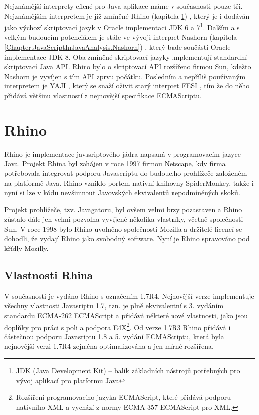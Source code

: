 Nejznámější interprety cílené pro Java aplikace máme v současnosti pouze tři. Nejznámějším interpretem je již zmíněné Rhino (kapitola \ref{Chapter.JavaScriptInJavaAnalysis.Rhino}) \cite{Bibliography.Rhino.Docs}, který je i dodáván jako výchozí skriptovací jazyk v Oracle implementaci JDK 6 a 7\footnote{JDK (Java Development Kit) -- balík základních nástrojů potřebných pro vývoj aplikací pro platformu Java}. Dalším a s velkým budoucím potenciálem je stále ve vývoji interpret Nashorn (kapitola \ref{Chapter.JavaScriptInJavaAnalysis.Nashorn}) \cite{Bibliography.Nashorn.Project}, který bude součásti Oracle implementace JDK 8. Oba zmíněné skriptovací jazyky implementují standardní skriptovací Java API. Rhino bylo o skriptovací API rozšířeno firmou Sun, kdežto Nashorn je vyvíjen s tím API zprvu počátku. Posledním a nepříliš používaným interpretem je YAJI \cite{Bibliography.YAJI.Project}, který se snaží oživit starý interpret FESI \cite{Bibliography.FESI.Project}, tím že do něho přidává většinu vlastností z nejnovější specifikace ECMAScriptu.

\section{Rhino}
\label{Chapter.JavaScriptInJavaAnalysis.Rhino}

Rhino je implementace javasriptového jádra napsaná v programovacím jazyce Java. Projekt Rhina byl zahájen v roce 1997 firmou Netscape, kdy firma potřebovala integrovat podporu Javascriptu do budoucího prohlížeče založeném na platformě Java. Rhino vzniklo portem nativní knihovny SpiderMonkey, takže i nyní si lze v kódu nevšimnout Javovských ekvivalentů nepodmíněných skoků. \cite{Bibliography.Rhino.History}

Projekt prohlížeče, tzv. Javagatoru, byl ovšem velmi brzy pozastaven a Rhino zůstalo dále jen velmi pozvolna vyvíjené několika vlastníky, včetně společnosti Sun. V roce 1998 bylo Rhino uvolněno společnosti Mozilla a držitelé licencí se dohodli, že vydají Rhino jako svobodný software. Nyní je Rhino spravováno pod křídly Mozilly. \cite{Bibliography.Rhino.History}

\subsection{Vlastnosti Rhina}
\label{Chapter.JavaScriptInJavaAnalysis.Rhino.RhinoFeatures}

V současnosti je vydáno Rhino s označením 1.7R4. Nejnovější verze implementuje všechny vlastnosti Javasriptu 1.7, tzn. je plně ekvivalentní s 3. vydáním standardu ECMA-262 ECMAScript a přidává některé nové vlastnosti, jako jsou doplňky pro práci s poli a podpora E4X\footnote{Rozšíření programovacího jazyka ECMAScript, které přidává podporu nativního XML a vychází z normy ECMA-357 ECMAScript pro XML.}. Od verze 1.7R3 Rhino přidává i částečnou podporu Javasriptu 1.8 a 5. vydání ECMAScriptu, která byla nejnovější verzi 1.7R4 zejména optimalizována a jen mírně rozšířena. \cite{Bibliography.Rhino.v17R3,Bibliography.Rhino.v17R4}

